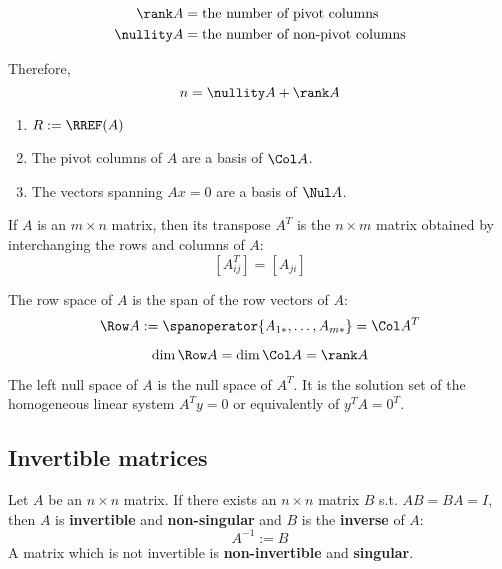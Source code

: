 \begin{lemma}
  \begin{align*}
    \rank A &= \text{the number of pivot columns} \\
    \nullity A &= \text{the number of non-pivot columns}
  \end{align*}
  
  Therefore,
  \[
    n = \nullity A + \rank A
  \]
\end{lemma}

\begin{procedure}
  \begin{enumerate}
    \item $R := \RREF(A)$
    \item The pivot columns of $A$ are a basis of $\Col A$.
    \item The vectors spanning $Ax = 0$ are a basis of $\Nul A$.
  \end{enumerate}
\end{procedure}

\begin{definition}
  If $A$ is an $m \times n$ matrix, then its transpose $A^T$ is the $n \times m$ matrix obtained by interchanging the rows and columns of $A$:
  \[
    \left[A^T_{ij}\right] = \left[A_{ji}\right]
  \]
\end{definition}

\begin{definition}
  The row space of $A$ is the span of the row vectors of $A$:
  \[
    \Row A := \spanoperator \{ A_{1*}, \ldots, A_{m*} \} = \Col A^T
  \]
\end{definition}

\begin{lemma}
  \[
    \dim \Row A = \dim \Col A = \rank A
  \]
\end{lemma}

\begin{definition}
  The left null space of $A$ is the null space of $A^T$. It is the solution set of the homogeneous linear system $A^T y = 0$ or equivalently of $y^T A = 0^T$.
\end{definition}

\subsection{Invertible matrices}

\begin{definition}
  Let $A$ be an $n \times n$ matrix. If there exists an $n \times n$ matrix $B$ s.t. $AB = BA = I$, then $A$ is \textbf{invertible} and \textbf{non-singular} and $B$ is the \textbf{inverse} of $A$:
  \[
    A^{-1} := B
  \]
  A matrix which is not invertible is \textbf{non-invertible} and \textbf{singular}.
\end{definition}

